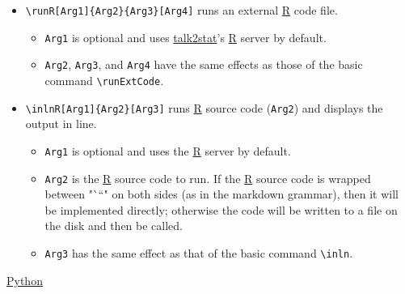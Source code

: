 \documentclass{ltxdoc}
\begin{document}
\begin{itemize}
\item \texttt{\textbackslash{}runR[Arg1]\{Arg2\}\{Arg3\}[Arg4]} runs an external
\href{https://www.r-project.org/}{R} code file.
\begin{itemize}
\item \texttt{Arg1} is optional and uses
\href{https://pypi.org/project/talk2stat/}{talk2stat}'s
\href{https://www.r-project.org/}{R} server by default.
\item \texttt{Arg2}, \texttt{Arg3}, and \texttt{Arg4} have the same effects as those of the
basic command \texttt{\textbackslash{}runExtCode}.
\end{itemize}
\item \texttt{\textbackslash{}inlnR[Arg1]\{Arg2\}[Arg3]} runs \href{https://www.r-project.org/}{R}
source code (\texttt{Arg2}) and displays the output in line.
\begin{itemize}
\item \texttt{Arg1} is optional and uses the \href{https://www.r-project.org/}{R}
server by default.
\item \texttt{Arg2} is the \href{https://www.r-project.org/}{R} source code to run.
If the \href{https://www.r-project.org/}{R} source code is wrapped
between "```" on both sides (as in the markdown grammar), then it
will be implemented directly; otherwise the code will be written to
a file on the disk and then be called.
\item \texttt{Arg3} has the same effect as that of the basic command \texttt{\textbackslash{}inln}.
\end{itemize}
\end{itemize}

\href{https://www.python.org/}{Python}
\end{document}
